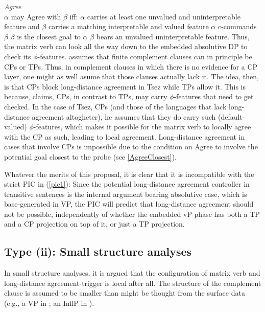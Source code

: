 \documentclass[output=paper
,modfonts
,nonflat]{langsci/langscibook}
\begin{document}
	\ea\label{ex:mueller:7} \label{Agree}{\itshape Agree}\\ $\alpha$ may Agree with $\beta$ iff:
	\ea  $\alpha$ carries at least one unvalued and uninterpretable
	feature and $\beta$ carries a matching interpretable and valued
	feature 
	\ex  $\alpha$ c-commands $\beta$
	\ex \label{AgreeClosest}$\beta$ is the closest goal to $\alpha$
	\ex \label{boerj:AC}$\beta$ bears an unvalued uninterpretable feature.
	\z
	\z
	Thus, the matrix verb can look all the way
	down to the embedded absolutive DP to check its
	$\phi$-features. \citet{Boskovic:07} assumes that finite complement
	clauses can in principle be CPs or TPs. Thus, in complement clauses in
	which there is no evidence for a CP layer, one might as well asume
	that those clauses actually lack it.
	The idea, then, is that CPs block long-distance agreement in Tsez while TPs allow it. This
	is because, \citet{Boskovic:07} claims, CPs, in contrast to TPs,
	may carry $\phi$-features that need to get checked. In the case of Tsez,
	CPs (and those of the languages that lack long-distance agreement altogheter), he assumes
	that they do carry such (default-valued) $\phi$-features, which makes it possible for
	the matrix verb to locally agree with the CP as such, leading to local
	agreement. Long-distance agreement in cases that involve CPs is impossible due to the
	condition on Agree to involve the potential goal closest to the probe
	(see \ref{AgreeClosest}).
	
	Whatever the merits of this proposal, it is clear that it is
	incompatible with the strict PIC in (\ref{pic1}): 
	Since the potential long-distance agreement controller  in
	transitive sentences is the internal argument bearing absolutive case, which is base-generated
	in VP, the PIC will predict that long-distance agreement should not be
	possible, independently of whether the embedded vP phase has both a TP
	and a CP projection on top of it, or just a TP projection. 
	
	\subsection{Type (ii): Small structure analyses}
	
	In small structure analyses, it is argued that the configuration of matrix verb
	and long-distance agree\-ment-trigger is local after all. The structure
	of the complement clause is assumed to be smaller than might be
	thought from the surface data (e.g., a VP in \citealt{Boeckx:04}; an
	InflP in \citealt{Bhatt:05}).
	
\end{document}
